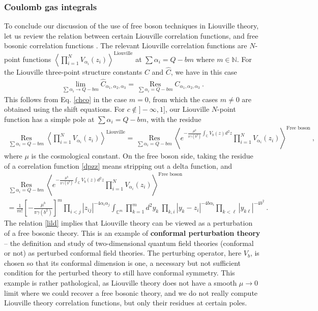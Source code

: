 \documentclass[12pt, a4paper, notitlepage, twoside]{report}
\numberwithin{equation}{section}
\theoremstyle{break}
\begin{document}
\subsubsection{Coulomb gas integrals}

To conclude our discussion of the use of free boson techniques in Liouville theory, let us review
the relation between certain Liouville correlation functions, and free bosonic correlation functions \cite{zz95}.
The relevant Liouville correlation functions are $N$-point functions $\left\langle \prod_{i=1}^N V_{\alpha_i}(z_i)\right\rangle^{\text{Liouville}}$ at $\sum\alpha_i = Q-bm$ where $m\in \mathbb{N}$.  
For the Liouville three-point structure constants $C$ and $\hat C$, we have in this case
\begin{align}
 \lim_{\sum\alpha_i \to Q-bm} \hat C_{\alpha_1,\alpha_2,\alpha_3} 
 = \underset{\sum \alpha_i = Q-bm}{\operatorname{Res}}  C_{\alpha_1,\alpha_2,\alpha_3}\ .
\end{align}
This follows from Eq. \eqref{chco} in the case $m=0$, from which the cases $m\neq 0$ are obtained using the shift equations.
For $c\notin ]-\infty,1]$, our Liouville $N$-point function has a simple pole at $\sum\alpha_i = Q-bm$, with the residue
\begin{align}
 \underset{\sum \alpha_i = Q-bm}{\operatorname{Res}} \left\langle \prod_{i=1}^N V_{\alpha_i}(z_i)\right\rangle^{\text{Liouville}} = \underset{\sum\alpha_i = Q-bm}{\operatorname{Res}} \left\langle e^{-\frac{\mu^b}{\pi\gamma(b^2)}\int_{\mathbb{C}} V_b(z)d^2z}\prod_{i=1}^N V_{\alpha_i}(z_i)\right\rangle^{\text{Free boson}}\ ,
\label{lild}
\end{align}
where $\mu$ is the cosmological constant.
On the free boson side, taking the residue of a correlation function \eqref{dpzz} means stripping out a delta function, and 
\begin{multline}
 \underset{\sum\alpha_i = Q-bm}{\operatorname{Res}} \left\langle e^{-\frac{\mu^b}{\pi\gamma(b^2)}\int_{\mathbb{C}} V_b(z)d^2z}\prod_{i=1}^N V_{\alpha_i}(z_i)\right\rangle^{\text{Free boson}}
\\
= \frac{1}{m!}\left[-\frac{\mu^b}{\pi\gamma(b^2)}\right]^m \prod_{i<j} |z_{ij}|^{-4\alpha_i\alpha_j} \int_{{\mathbb{C}}^m} \prod_{k=1}^m d^2y_k\ \prod_{k,i} |y_k-z_i|^{-4b\alpha_i}\prod_{k<\ell} |y_{k\ell}|^{-4b^2}\ .
\label{mint}
\end{multline}
The relation \eqref{lild} implies that Liouville theory can be viewed as a perturbation of a free bosonic theory.
This is an example of \textbf{\boldmath conformal perturbation theory} -- the definition and study of two-dimensional quantum field theories (conformal or not) as perturbed conformal field theories.
The perturbing operator, here $V_b$, is chosen so that its conformal dimension is one, a necessary but not sufficient condition for the perturbed theory to still have conformal symmetry.
This example is rather pathological, as Liouville theory does not have a smooth $\mu\to 0$ limit where we could recover a free bosonic theory, and we do not really compute Liouville theory correlation functions, but only their residues at certain poles. 
\end{document}
